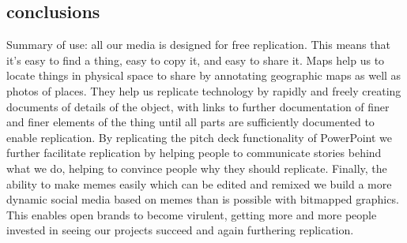 \subsection{conclusions}

Summary of use: all our media is designed for free replication.  This means that it's easy to find a thing, easy to copy it, and easy to share it.  Maps help us to locate things in physical space to share by annotating geographic maps as well as photos of places.  They help us replicate technology by rapidly and freely creating documents of details of the object, with links to further documentation of finer and finer elements of the thing until all parts are sufficiently documented to enable replication.  By replicating the pitch deck functionality of PowerPoint we further facilitate replication by helping people to communicate stories behind what we do, helping to convince people why they should replicate.  Finally, the ability to make memes easily which can be edited and remixed we build a more dynamic social media based on memes than is possible with bitmapped graphics.  This enables open brands to become virulent, getting more and more people invested in seeing our projects succeed and again furthering replication.


